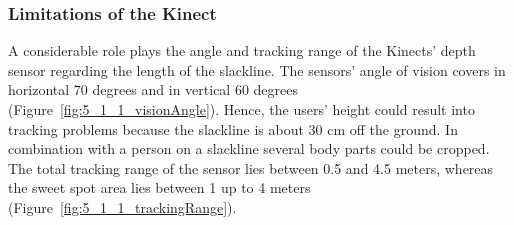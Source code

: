 \subsubsection{Limitations of the Kinect} 
A considerable role plays the angle and tracking range of the Kinects' depth sensor regarding the length of the slackline. The sensors’ angle of vision covers in horizontal 70 degrees and in vertical 60 degrees (Figure~\ref{fig:5_1_1_visionAngle}). Hence, the users' height could result into tracking problems because the slackline is about 30 cm off the ground. In combination with a person on a slackline several body parts could be cropped. The total tracking range of the sensor lies between 0.5 and 4.5 meters, whereas the sweet spot area lies between 1 up to 4 meters~\cite{MicrosoftHIG2014-mh} (Figure~\ref{fig:5_1_1_trackingRange}). 


